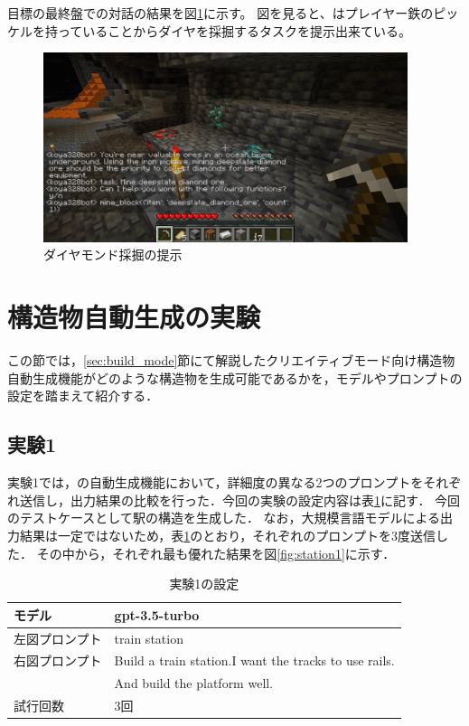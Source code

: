 目標の最終盤での対話の結果を図\ref{fig:final_task}に示す。
図を見ると、{\mason}はプレイヤー鉄のピッケルを持っていることからダイヤを採掘するタスクを提示出来ている。

\begin{figure}[H]
    \centering
    \includegraphics[width=0.95\textwidth]{fig/final_task.png}
    \caption{ダイヤモンド採掘の提示}
    \label{fig:final_task}
\end{figure}

\section{構造物自動生成の実験}\label{sec:build_mode_generate}
この節では，\ref{sec:build_mode}節にて解説したクリエイティブモード向け構造物自動生成機能がどのような構造物を生成可能であるかを，モデルやプロンプトの設定を踏まえて紹介する．

\subsection{実験1}\label{sec:ex1}
実験1では，{\mason}の自動生成機能において，詳細度の異なる2つのプロンプトをそれぞれ送信し，出力結果の比較を行った．今回の実験の設定内容は表\ref{tab:setting1}に記す．
今回のテストケースとして駅の構造を生成した．
なお，大規模言語モデルによる出力結果は一定ではないため，表\ref{tab:setting1}のとおり，それぞれのプロンプトを3度送信した．
その中から，それぞれ最も優れた結果を図\ref{fig:station1}に示す．
\begin{table}[H]
    \caption{実験1の設定}\label{tab:setting1}
    \centering
    \begin{tabular}{ll}
        \hline \hline
        モデル & gpt-3.5-turbo \\
        \hline
        左図プロンプト & train station \\
        \hline
        右図プロンプト & Build a train station.I want the tracks to use rails. \\
        　 & And build the platform well. \\
        \hline
        試行回数 & 3回 \\
        \hline
    \end{tabular}
\end{table}

